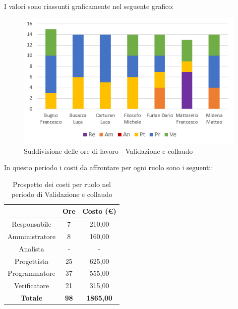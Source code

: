 I valori sono riassunti graficamente nel seguente grafico:

\begin{figure}[H]
  \centering
  \includegraphics[scale=1]{immagini/ore_lavoro_Validazione.png}
  \caption{Suddivisione delle ore di lavoro - Validazione e collaudo}
\end{figure}

\pagebreak
In questo periodo i costi da affrontare per ogni ruolo sono i seguenti:

\begin{table}[H]
  \centering
  \renewcommand{\arraystretch}{1.8}
  \begin{tabular}{c|c|c}
    \rowcolor[HTML]{125E28}
    \multicolumn{1}{c}{\color[HTML]{FFFFFF}\textbf{Ruolo}}
                    & \multicolumn{1}{c}{\color[HTML]{FFFFFF}\textbf{Ore}}
                    & \multicolumn{1}{c}{\color[HTML]{FFFFFF}\textbf{Costo (€)}}                    \\
    \hline
    Responsabile    & 7                                                          & 210,00           \\
    Amministratore  & 8                                                          & 160,00           \\
    Analista        & -                                                          & -                \\
    Progettista     & 25                                                         & 625,00           \\
    Programmatore   & 37                                                         & 555,00           \\
    Verificatore    & 21                                                         & 315,00           \\
    \textbf{Totale} & \textbf{98}                                                & \textbf{1865,00}
  \end{tabular}
  \caption{Prospetto dei costi per ruolo nel periodo di Validazione e collaudo}
\end{table}

